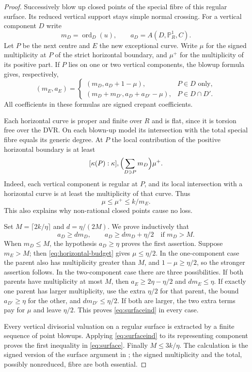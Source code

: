 \documentclass[11pt,reqno]{amsart}
\numberwithin{equation}{section}
\theoremstyle{definition}
\theoremstyle{remark}
\newcommand{\PP}{\mathbb P}
\newcommand{\ord}{\operatorname{ord}}
\begin{document}
\begin{proof}
Successively blow up closed points of the special fibre of this regular surface. Its reduced vertical support stays simple normal crossing. For a vertical component $D$ write
\[
 m_D=\ord_D(u),\qquad a_D=A(D,\PP^1_R,C).
\]
Let $P$ be the next centre and $E$ the new exceptional curve. Write $\mu$ for the signed multiplicity at $P$ of the strict horizontal boundary, and $\mu^+$ for the multiplicity of its positive part. If $P$ lies on one or two vertical components, the blowup formula gives, respectively,
\begin{equation}\label{eq:blowup}
 (m_E,a_E)=
 \begin{cases}
 (m_D,a_D+1-\mu),&P\in D\text{ only},\\
 (m_D+m_{D'},a_D+a_{D'}-\mu),&P\in D\cap D'.
 \end{cases}
\end{equation}
All coefficients in these formulas are signed crepant coefficients.

Each horizontal curve is proper and finite over $R$ and is flat, since it is torsion free over the DVR. On each blown-up model its intersection with the total special fibre equals its generic degree. At $P$ the local contribution of the positive horizontal boundary is at least
\[
 [\kappa(P):\kappa],\Bigl(\sum_{D\ni P}m_D\Bigr)\mu^+.
\]
Indeed, each vertical component is regular at $P$, and its local intersection with a horizontal curve is at least the multiplicity of that curve. Thus
\begin{equation}\label{eq:horizontal-budget}
 \mu\le\mu^+\le k/m_E.
\end{equation}
This also explains why non-rational closed points cause no loss.

Set $M=\lceil2k/\eta\rceil$ and $d=\eta/(2M)$. We prove inductively that
\begin{equation}\label{eq:surfaceind}
 a_D\ge dm_D,\qquad
 a_D\ge dm_D+\eta/2\quad\text{if }m_D>M.
\end{equation}
When $m_D\le M$, the hypothesis $a_D\ge\eta$ proves the first assertion. Suppose $m_E>M$; then \eqref{eq:horizontal-budget} gives $\mu\le\eta/2$. In the one-component case the parent also has multiplicity greater than $M$, and $1-\mu\ge\eta/2$, so the stronger assertion follows. In the two-component case there are three possibilities. If both parents have multiplicity at most $M$, then $a_E\ge2\eta-\eta/2$ and $dm_E\le\eta$. If exactly one parent has larger multiplicity, use the extra $\eta/2$ for that parent, the bound $a_{D'}\ge\eta$ for the other, and $dm_{D'}\le\eta/2$. If both are larger, the two extra terms pay for $\mu$ and leave $\eta/2$. This proves \eqref{eq:surfaceind} in every case.

Every vertical divisorial valuation on a regular surface is extracted by a finite sequence of point blowups. Applying \eqref{eq:surfaceind} to its representing component proves the first inequality in \eqref{eq:surface}. Finally $M\le3k/\eta$. The calculation is the signed version of the surface argument in \cite[Proposition~3.1]{Jiao}; the signed multiplicity and the total, possibly nonreduced, fibre are both essential.
\end{proof}
\end{document}
